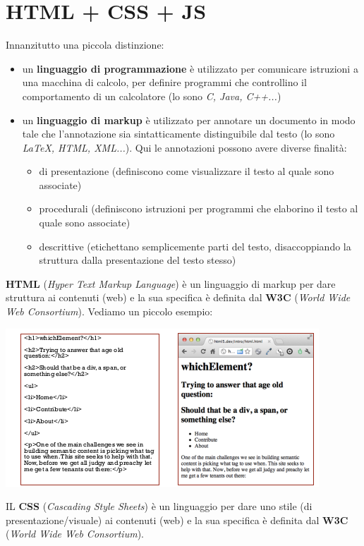 \documentclass[a4paper,12pt, oneside]{book}
\begin{document}
\chapter{HTML + CSS + JS}
Innanzitutto una piccola distinzione:
\begin{itemize}
	\item un \textbf{linguaggio di programmazione} è utilizzato per comunicare istruzioni a
	      una macchina di calcolo, per definire programmi che controllino il comportamento di un calcolatore (lo sono \textit{C, Java, C++...})
	\item un \textbf{linguaggio di markup} è utilizzato per annotare un documento in modo
	      tale che l'annotazione sia sintatticamente distinguibile dal testo (lo sono \textit{LaTeX, HTML, XML...}). Qui le annotazioni possono avere diverse finalità:
	      \begin{itemize}
		      \item di presentazione (definiscono come visualizzare il testo al quale sono associate)
		      \item procedurali (definiscono istruzioni per programmi che elaborino il testo al quale sono associate)
		      \item descrittive (etichettano semplicemente parti del testo, disaccoppiando la struttura dalla presentazione del testo stesso)
	      \end{itemize}
\end{itemize}
\textbf{HTML} (\textit{Hyper Text Markup Language}) è un linguaggio di markup per dare struttura ai contenuti (web) e la sua specifica è definita dal \textbf{W3C} (\textit{World Wide Web Consortium}).
\newpage
Vediamo un piccolo esempio:
\begin{center}
	\includegraphics[scale=0.9]{img/html.png}
\end{center}
IL \textbf{CSS} (\textit{Cascading Style Sheets}) è un linguaggio per dare uno stile (di presentazione/visuale) ai contenuti (web) e la sua specifica è definita dal \textbf{W3C} (\textit{World Wide Web Consortium}).
\end{document}
